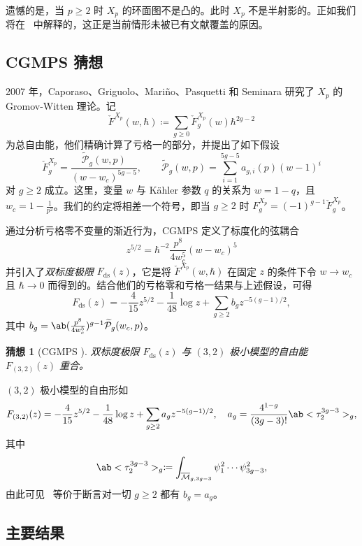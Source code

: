 \documentclass{amsart}
\newtheorem{conj}[thm]{猜想}
\theoremstyle{definition}
\theoremstyle{remark}
\theoremstyle{plain}
\theoremstyle{definition}
\theoremstyle{remark}
\newcommand{\Mbar}{\overline{\mathcal{M}}}
\newcommand{\mc}[1]{\mathcal{#1}}
\newcommand{\mr}[1]{\mathrm{#1}}
\newcommand{\wt}[1]{\widetilde{#1}}
\newcommand{\1}{\mathbf{1}}
\newcommand{\2}{\mathbf{2}}
\newcommand{\3}{\mathbf{3}}
\begin{document}
遗憾的是，当 \(p \geq 2\) 时 \(X_p\) 的环面图不是凸的。此时 \(X_p\) 不是半射影的。正如我们将在~ 中解释的，这正是当前情形未被已有文献覆盖的原因。

\subsection{CGMPS 猜想}%
\label{sub:The conjecture of CGMPS}

2007 年，Caporaso、Griguolo、Mari\~{n}o、Pasquetti 和 Seminara 研究了 \(X_p\) 的 Gromov-Witten 理论。记
\[ \check{F}^{X_p}(w,\hbar) \coloneqq \sum_{g \geq 0} \check{F}_g^{X_p}(w) \hbar^{2g-2} \]
为总自由能，他们精确计算了亏格一的部分，并提出了如下假设
\begin{equation}\label{eqn:cgmps ansatz}
    \check{F}_g^{X_p} = \frac{\wt{\mc{P}}_g(w,p)}{(w-w_c)^{5g-5}}, \qquad \wt{\mc{P}}_g(w,p) = \sum_{i=1}^{5g-5} a_{g,i}(p)(w-1)^i
\end{equation}
对 \(g \geq 2\) 成立。这里，变量 \(w\) 与 K\"ahler 参数 \(q\) 的关系为 \(w = 1-q\)，且 \(w_c = 1 - \frac{1}{p^2}\)。我们的约定将相差一个符号，即当 \(g \geq 2\) 时 \(F_g^{X_p} = (-1)^{g-1}\check{F}_g^{X_p}\)。

通过分析亏格零不变量的渐近行为，CGMPS 定义了标度化的弦耦合
\[ z^{5/2} = \hbar^{-2} \frac{p^8}{4w_c^5}(w-w_c)^5 \]
并引入了\textit{双标度极限} \(F_{\mr{ds}}(z)\)，它是将 \(\check{F}^{X_p}(w,\hbar)\) 在固定 \(z\) 的条件下令 \(w \to w_c\) 且 \(\hbar \to 0\) 而得到的。结合他们的亏格零和亏格一结果与上述假设，可得
\[ F_{\mr{ds}}(z) = -\frac{4}{15}z^{5/2} - \frac{1}{48}\log z + \sum_{g \geq 2} b_g z^{-5(g-1)/2}, \]
其中 \(b_g = \ab(\frac{p^8}{4w_c^5})^{g-1}\wt{\mc{P}}_g(w_c,p)\)。

\begin{conj}[CGMPS {\cite{CGMPS2007}}]%
\label{conj:cgmps}
    双标度极限 \(F_{\mr{ds}}(z)\) 与 \((3,2)\) 极小模型的自由能 \(F_{(3,2)}(z)\) 重合。
\end{conj}

\((3,2)\) 极小模型的自由形如
\[ F_{(3,2)}(z) = -\frac{4}{15}z^{5/2} - \frac{1}{48}\log z + \sum_{g\geq2} a_g z^{-5(g-1)/2}, \quad a_g = \frac{4^{1-g}}{(3g-3)!}\ab<\tau_2^{3g-3}>_g, \]
其中
\[ \ab<\tau_2^{3g-3}>_g \coloneqq \int_{\Mbar_{g,3g-3}} \psi_1^2 \cdots \psi_{3g-3}^2, \]
由此可见~ 等价于断言对一切 \(g \geq 2\) 都有 \(b_g = a_g\)。

\subsection{主要结果}%
\label{sub:The main results (Guo local P1)}
\end{document}
